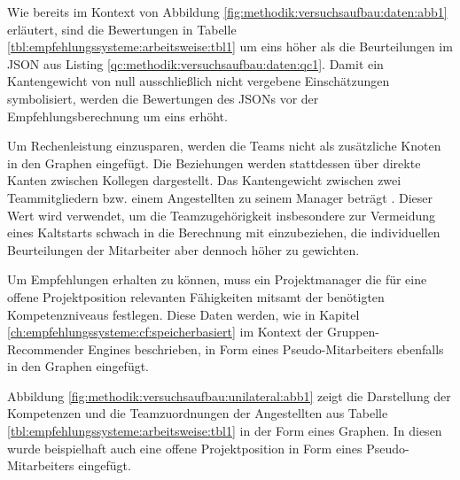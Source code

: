 Wie bereits im Kontext von Abbildung \ref{fig:methodik:versuchsaufbau:daten:abb1} erläutert, sind die Bewertungen in Tabelle \ref{tbl:empfehlungssysteme:arbeitsweise:tbl1} um eins höher als die Beurteilungen im \ac{JSON} aus Listing \ref{qc:methodik:versuchsaufbau:daten:qc1}. Damit ein Kantengewicht von null ausschließlich nicht vergebene Einschätzungen symbolisiert, werden die Bewertungen des \acp{JSON} vor der Empfehlungsberechnung um eins erhöht.

Um Rechenleistung einzusparen, werden die Teams nicht als zusätzliche Knoten in den Graphen eingefügt. Die Beziehungen werden stattdessen über direkte Kanten zwischen Kollegen dargestellt. Das Kantengewicht zwischen zwei Teammitgliedern bzw. einem Angestellten zu seinem Manager beträgt \kantengewichtString. Dieser Wert wird verwendet, um die Teamzugehörigkeit insbesondere zur Vermeidung eines Kaltstarts schwach in die Berechnung mit einzubeziehen, die individuellen Beurteilungen der Mitarbeiter aber dennoch höher zu gewichten.%

Um Empfehlungen erhalten zu können, muss ein Projektmanager die für eine offene Projektposition relevanten Fähigkeiten mitsamt der benötigten Kompetenzniveaus festlegen. Diese Daten werden, wie in Kapitel \ref{ch:empfehlungssysteme:cf:speicherbasiert} im Kontext der Gruppen-Recommender Engines beschrieben, in Form eines Pseudo-Mitarbeiters ebenfalls in den Graphen eingefügt.

Abbildung \ref{fig:methodik:versuchsaufbau:unilateral:abb1} zeigt die Darstellung der Kompetenzen und die Teamzuordnungen der Angestellten aus Tabelle \ref{tbl:empfehlungssysteme:arbeitsweise:tbl1} in der Form eines Graphen. In diesen wurde beispielhaft auch eine offene Projektposition in Form eines Pseudo-Mitarbeiters eingefügt.

